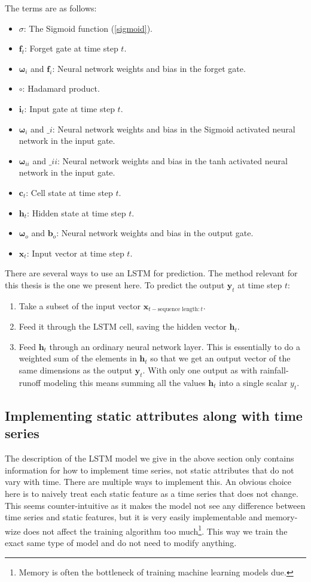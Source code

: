 The terms are as follows:
\begin{itemize}
    \item $\sigma$: The Sigmoid function (\ref{sigmoid}).
    \item $\bm{f}_t$: Forget gate at time step $t$.
    \item $\bm{\omega}_i$ and $\bm{f}_i$: Neural network weights and bias in the forget gate.
    \item $\circ$: Hadamard product.
    \item $\bm{i}_t$: Input gate at time step $t$.
    \item $\bm{\omega}_i$ and $\bm_i$: Neural network weights and bias in the Sigmoid activated neural network in the input gate.
    \item $\bm{\omega}_{ii}$ and $\bm_{ii}$: Neural network weights and bias in the tanh activated neural network in the input gate.
    \item $\bm{c}_t$: Cell state at time step $t$.
    \item $\bm{h}_t$: Hidden state at time step $t$.
    \item $\bm{\omega}_o$ and $\bm{b}_o$: Neural network weights and bias in the output gate.
    \item $\bm{x}_t$: Input vector at time step $t$.
\end{itemize}
There are several ways to use an LSTM for prediction. The method relevant for this 
thesis is the one we present here.
To predict the output $\bm{y}_t$ at time step $t$:
\begin{enumerate}
    \item Take a subset of the input vector $\bm{x}_{t-\text{sequence length}:t}$.
    \item Feed it through the LSTM cell, saving the hidden vector $\bm{h}_t$.
    \item Feed $\bm{h}_t$ through an ordinary neural network layer. This is essentially to do a weighted sum of the elements in $\bm{h}_t$ so that we get an output vector of the same dimensions as the output $\bm{y}_t$. With only one output as with rainfall-runoff modeling this means summing all the values $\bm{h}_t$ into a single scalar $y_t$.
\end{enumerate}
\subsection{Implementing static attributes along with time series}
The description of the LSTM model we give in the above section only contains information 
for how to implement time series, not static attributes that do not vary 
with time. There are multiple ways to implement this. An obvious choice here is to 
naively treat each static feature as a time series that does not change. This seems 
counter-intuitive as it makes the model not see any difference between time series and 
static features, but it is very easily implementable and memory-wize does not affect 
the training algorithm too much\footnote{Memory is often the bottleneck of training 
machine learning models due.}. 
This way we train the exact same type 
of model and do not need to modify anything.

